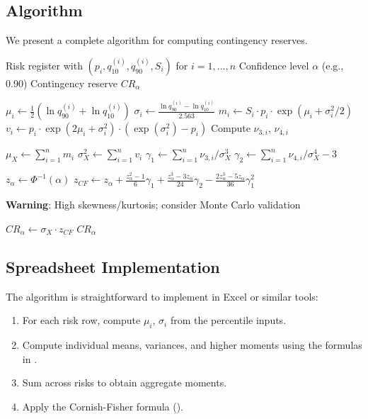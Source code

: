 \documentclass[12pt,a4paper]{article}
\theoremstyle{definition}
\theoremstyle{remark}
\begin{document}
\subsection{Algorithm}

We present a complete algorithm for computing contingency reserves.

\begin{algorithm}[htbp]
\caption{Analytical Contingency Reserve Calculation}
\label{alg:contingency}
\begin{algorithmic}[1]
\Require Risk register with $(p_i, q_{10}^{(i)}, q_{90}^{(i)}, S_i)$ for $i = 1, \ldots, n$
\Require Confidence level $\alpha$ (e.g., 0.90)
\Ensure Contingency reserve $CR_\alpha$

    \State $\mu_i \gets \frac{1}{2}(\ln q_{90}^{(i)} + \ln q_{10}^{(i)})$
    \State $\sigma_i \gets \frac{\ln q_{90}^{(i)} - \ln q_{10}^{(i)}}{2.563}$
    \State $m_i \gets S_i \cdot p_i \cdot \exp(\mu_i + \sigma_i^2/2)$
    \State $v_i \gets p_i \cdot \exp(2\mu_i + \sigma_i^2) \cdot (\exp(\sigma_i^2) - p_i)$
    \State Compute $\nu_{3,i}$, $\nu_{4,i}$ 
\EndFor

\State $\mu_X \gets \sum_{i=1}^n m_i$
\State $\sigma_X^2 \gets \sum_{i=1}^n v_i$
\State $\gamma_1 \gets \sum_{i=1}^n \nu_{3,i} / \sigma_X^3$
\State $\gamma_2 \gets \sum_{i=1}^n \nu_{4,i} / \sigma_X^4 - 3$

\State $z_\alpha \gets \Phi^{-1}(\alpha)$
\State $z_{CF} \gets z_\alpha + \frac{z_\alpha^2 - 1}{6}\gamma_1 + \frac{z_\alpha^3 - 3z_\alpha}{24}\gamma_2 - \frac{2z_\alpha^3 - 5z_\alpha}{36}\gamma_1^2$

    \State \textbf{Warning}: High skewness/kurtosis; consider Monte Carlo validation
\EndIf

\State $CR_\alpha \gets \sigma_X \cdot z_{CF}$
\State \Return $CR_\alpha$
\end{algorithmic}
\end{algorithm}

\subsection{Spreadsheet Implementation}

The algorithm is straightforward to implement in Excel or similar tools:

\begin{enumerate}
    \item For each risk row, compute $\mu_i$, $\sigma_i$ from the percentile inputs.
    \item Compute individual means, variances, and higher moments using the formulas in .
    \item Sum across risks to obtain aggregate moments.
    \item Apply the Cornish-Fisher formula ().
\end{enumerate}
\end{document}
